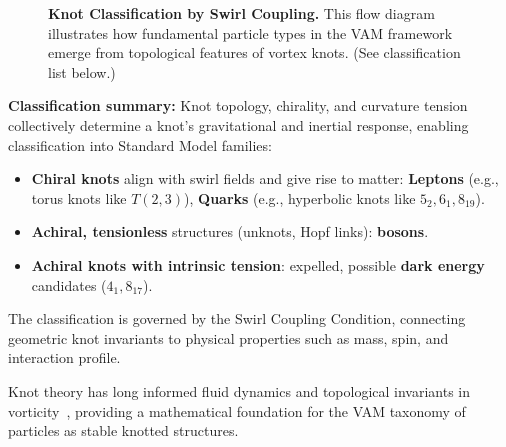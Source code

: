 \begin{figure}[!ht]
{
    }
    \caption{
        \textbf{Knot Classification by Swirl Coupling.}
        This flow diagram illustrates how fundamental particle types in the VAM framework emerge from topological features of vortex knots. (See classification list below.)
    }
    \label{fig:taxonomy}

\end{figure}

\vspace{0.1em}
\textbf{Classification summary:}
Knot topology, chirality, and curvature tension collectively determine a knot’s gravitational and inertial response, enabling classification into Standard Model families:
\begin{itemize}
    \item \textbf{Chiral knots} align with swirl fields and give rise to matter: \textbf{Leptons} (e.g., torus knots like \( T(2,3) \)), \textbf{Quarks} (e.g., hyperbolic knots like \( 5_2, 6_1, 8_{19} \)).
    \item \textbf{Achiral, tensionless} structures (unknots, Hopf links): \textbf{bosons}.
    \item \textbf{Achiral knots with intrinsic tension}: expelled, possible \textbf{dark energy} candidates (\( 4_1, 8_{17} \)).
\end{itemize}
\vspace{0.3em}

The classification is governed by the Swirl Coupling Condition, connecting geometric knot invariants to physical properties such as mass, spin, and interaction profile.

Knot theory has long informed fluid dynamics and topological invariants in vorticity~\cite{knot_theroy_in_fluid}, providing a mathematical foundation for the VAM taxonomy of particles as stable knotted structures.

